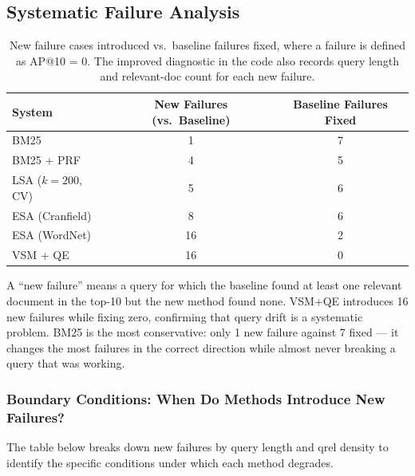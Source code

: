 \documentclass{article}
\begin{document}
\subsection{Systematic Failure Analysis}

\begin{table}[H]
\centering
\renewcommand{\arraystretch}{1.2}
\begin{tabular}{lcc}
\toprule
\textbf{System} & \textbf{New Failures (vs.\ Baseline)} & \textbf{Baseline Failures Fixed} \\
\midrule
BM25           & 1  & 7  \\
BM25 + PRF     & 4  & 5  \\
LSA ($k{=}200$, CV) & 5  & 6  \\
ESA (Cranfield)& 8  & 6  \\
ESA (WordNet)  & 16 & 2  \\
VSM + QE       & 16 & 0  \\
\bottomrule
\end{tabular}
\caption{New failure cases introduced vs.\ baseline failures fixed, where a failure is defined as AP@10 = 0. The improved diagnostic in the code also records query length and relevant-doc count for each new failure.}
\end{table}

A ``new failure'' means a query for which the baseline found at least one relevant document in the top-10 but the new method found none. VSM+QE introduces 16 new failures while fixing zero, confirming that query drift is a systematic problem. BM25 is the most conservative: only 1 new failure against 7 fixed --- it changes the most failures in the correct direction while almost never breaking a query that was working.

\subsubsection*{Boundary Conditions: When Do Methods Introduce New Failures?}

The table below breaks down new failures by query length and qrel density to identify the specific conditions under which each method degrades.
\end{document}
